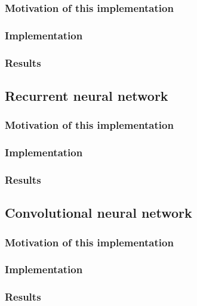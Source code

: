 \documentclass{article}
\begin{document}
    \subsubsection{Motivation of this implementation}

    \subsubsection{Implementation}

    \subsubsection{Results}

    \subsection{Recurrent neural network}\label{subsec:recurrent-neural-network}

    \subsubsection{Motivation of this implementation}

    \subsubsection{Implementation}

    \subsubsection{Results}

    \subsection{Convolutional neural network}\label{subsec:convolutional-neural-network}

    \subsubsection{Motivation of this implementation}

    \subsubsection{Implementation}

    \subsubsection{Results}
\end{document}
